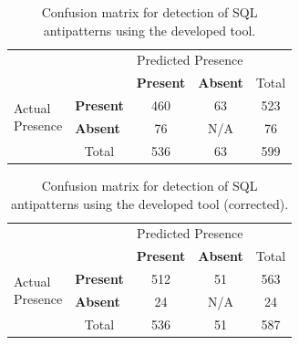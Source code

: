 \begin{table}[H]
    \centering
    \caption{Confusion matrix for detection of SQL antipatterns using the developed tool.}
    \label{tab:toolConfusion}
    \begin{tabular}{l|l|c|c|c}
        \multicolumn{2}{c}{}&\multicolumn{2}{c}{Predicted Presence}&\\
        \cline{3-4}
        \multicolumn{2}{c|}{}&\textbf{Present}&\textbf{Absent}&\multicolumn{1}{c}{Total}\\
        \cline{2-4}
        \multirow{2}{1.5cm}{Actual\\Presence}& \textbf{Present} & 460 & 63 & 523\\
        \cline{2-4}
        & \textbf{Absent} & 76 & N/A\footnotemark & 76\\
        \cline{2-4}
        \multicolumn{1}{c}{} & \multicolumn{1}{c}{Total} & \multicolumn{1}{c}{536} & \multicolumn{1}{c}{63} & \multicolumn{1}{c}{599}\\
    \end{tabular}
\end{table}

\begin{table}[H]
    \centering
    \caption{Confusion matrix for detection of SQL antipatterns using the developed tool (corrected).}
    \label{tab:toolConfusionCorrected}
    \begin{tabular}{l|l|c|c|c}
        \multicolumn{2}{c}{}&\multicolumn{2}{c}{Predicted Presence}&\\
        \cline{3-4}
        \multicolumn{2}{c|}{}&\textbf{Present}&\textbf{Absent}&\multicolumn{1}{c}{Total}\\
        \cline{2-4}
        \multirow{2}{1.5cm}{Actual\\Presence}& \textbf{Present} & 512 & 51 & 563\\
        \cline{2-4}
        & \textbf{Absent} & 24 & N/A & 24\\
        \cline{2-4}
        \multicolumn{1}{c}{} & \multicolumn{1}{c}{Total} & \multicolumn{1}{c}{536} & \multicolumn{1}{c}{51} & \multicolumn{1}{c}{587}\\
    \end{tabular}
\end{table}

